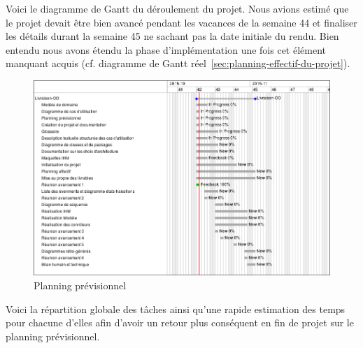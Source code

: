 \documentclass[paper=a4,fontsize=11pt]{report}
\numberwithin{equation}{section}		%
\numberwithin{figure}{section}		%
\numberwithin{table}{section}		%
\begin{document}
Voici le diagramme de Gantt du déroulement du projet.
Nous avions estimé que le projet devait être bien avancé pendant les vacances de la semaine 44 et finaliser les détails durant la semaine 45 ne sachant pas la date initiale du rendu. Bien entendu nous avons étendu la phase d'implémentation une fois cet élément manquant acquis (cf. diagramme de Gantt réel~\ref{sec:planning-effectif-du-projet}).

\begin{figure}[H]
\centering
\includegraphics[scale=0.5,angle=0]{redmine/gantt-prev.png}
\caption{Planning prévisionnel}
\end{figure}

Voici la répartition globale des tâches ainsi qu'une rapide estimation des temps pour chacune d'elles afin d'avoir un retour plus conséquent en fin de projet sur le planning prévisionnel.
\end{document}
